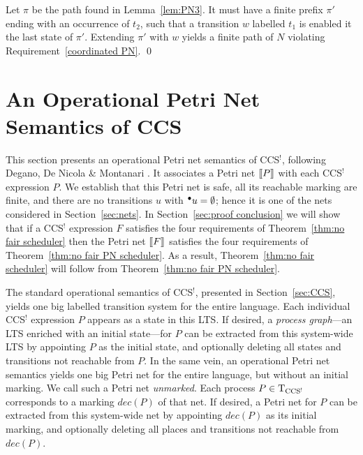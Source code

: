 \documentclass[smallcondensed]{svjour3}
\newcommand{\T}{{\rm T}}                             \newcommand{\SC}{{\rm G}}                            \newcommand{\E}{P}                                   \newcommand{\F}{Q}                                   \newcommand{\G}{\cal G}
\newcommand{\Thm}[1]{Theorem~\ref{thm:#1}}
\newcommand{\Lem}[1]{Lemma~\ref{lem:#1}}
\newcommand{\Sect}[1]{Section~\ref{sec:#1}}
\newcommand{\myref}[1]{\hyperlink{lab:#1}{\sc (#1)}\xspace}
\newcommand{\mand}{\&\xspace}
\begin{document}
\begin{trivlist}
\item[\hspace{\labelsep}{\bf Proof of \Thm{no fair PN scheduler}}]
Let $\pi$ be the path found in \Lem{PN3}.
It must have a finite prefix $\pi'$ ending with an occurrence of $t_2$, such that a transition $w$
labelled $t_1$ is enabled it the last state of $\pi'$.
Extending $\pi'$ with $w$ yields a finite path of $N$ violating Requirement~\ref{coordinated PN}.
\qed
\end{trivlist}

\section{An Operational Petri Net Semantics of CCS}\label{sec:operational PN}


\newcommand{\weg}[1]{}
\newcommand{\src}{{\it src}}
\newcommand{\target}{{\it target}}
\newcommand{\shar}[1]{\mathord{\stackrel{#1}{\rightarrow}}}
\renewcommand{\myref}[1]{\hyperlink{lab:#1}{\sc (#1)}}

This section presents an operational Petri net semantics of CCS$^!\!$, following
Degano, De Nicola \mand Montanari \cite{DDM87}.
It associates a Petri net $[\hspace{-1.4pt}[P]\hspace{-1.4pt}]$ with each CCS$^!$ expression $P$.
We establish that this Petri net is safe, all its reachable marking are
finite, and there are no transitions $u$ with $\precond{u}=\emptyset$;
hence it is one of the nets considered in \Sect{nets}. In \Sect{proof conclusion}
we will show that if a CCS$^!$ expression $F$ satisfies the four requirements of \Thm{no fair scheduler}
then the Petri net $[\hspace{-1.4pt}[F]\hspace{-1.4pt}]$ satisfies the four requirements of \Thm{no fair PN scheduler}.
As a result, \Thm{no fair scheduler} will follow from \Thm{no fair PN scheduler}.

The standard operational semantics of CCS$^!$, presented in \Sect{CCS}, yields one big labelled
transition system for the entire language. Each individual CCS$^!$ expression $P$ appears as a state in
this LTS\@.  If desired, a \emph{process graph}---an LTS enriched with an initial state---for $P$
can be extracted from this system-wide LTS by appointing $P$ as the initial state, and optionally
deleting all states and transitions not reachable from $P$. In the same vein, an operational Petri
net semantics yields one big Petri net for the entire language, but without an initial marking.
We call such a Petri net {\em unmarked}. Each
process $P\in\T_{\rm CCS^!}$ corresponds to a marking $dec(P)$ of that net. If desired, a Petri net
for $P$ can be extracted from this system-wide net by appointing $dec(P)$ as its initial marking,
and optionally deleting all places and transitions not reachable from $dec(P)$.
\end{document}
